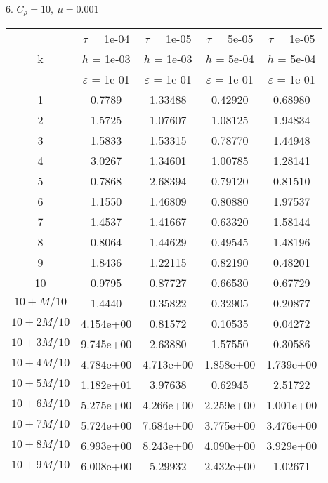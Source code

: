6. $C_{\rho} = 10, \ \mu = 0.001$
\begin{center}
	\begin{tabular}{ |c|c|c|c|c| } 
		\hline
		& $\tau$ = 1e-04 & $\tau$ = 1e-05 & $\tau$ = 5e-05 & $\tau$ = 1e-05 \\ 
		k & $h$ = 1e-03 & $h$ = 1e-03 & $h$ = 5e-04 & $h$ = 5e-04 \\ 
		& $\varepsilon$ = 1e-01 & $\varepsilon$ = 1e-01 & $\varepsilon$ = 1e-01 & $\varepsilon$ = 1e-01 \\ 
		\hline
		1 & 0.7789 & 1.33488 & 0.42920 & 0.68980 \\
		\hline
		2 & 1.5725 & 1.07607 & 1.08125 & 1.94834 \\
		\hline
		3 & 1.5833 & 1.53315 & 0.78770 & 1.44948 \\
		\hline
		4 & 3.0267 & 1.34601 & 1.00785 & 1.28141 \\
		\hline
		5 & 0.7868 & 2.68394 & 0.79120 & 0.81510 \\
		\hline
		6 & 1.1550 & 1.46809 & 0.80880 & 1.97537 \\
		\hline
		7 & 1.4537 & 1.41667 & 0.63320 & 1.58144 \\
		\hline
		8 & 0.8064 & 1.44629 & 0.49545 & 1.48196 \\
		\hline
		9 & 1.8436 & 1.22115 & 0.82190 & 0.48201 \\
		\hline
		10 & 0.9795 & 0.87727 & 0.66530 & 0.67729 \\
		\hline
		$10 + M/10$ & 1.4440 & 0.35822 & 0.32905 & 0.20877 \\
		\hline
		$10 + 2M/10$ & 4.154e+00 & 0.81572 & 0.10535 & 0.04272 \\
		\hline
		$10 + 3M/10$ & 9.745e+00 & 2.63880 & 1.57550 & 0.30586 \\
		\hline
		$10 + 4M/10$ & 4.784e+00 & 4.713e+00 & 1.858e+00 & 1.739e+00 \\
		\hline
		$10 + 5M/10$ & 1.182e+01 & 3.97638 & 0.62945 & 2.51722 \\
		\hline
		$10 + 6M/10$ & 5.275e+00 & 4.266e+00 & 2.259e+00 & 1.001e+00 \\
		\hline
		$10 + 7M/10$ & 5.724e+00 & 7.684e+00 & 3.775e+00 & 3.476e+00 \\
		\hline
		$10 + 8M/10$ & 6.993e+00 & 8.243e+00 & 4.090e+00 & 3.929e+00 \\
		\hline
		$10 + 9M/10$ & 6.008e+00 & 5.29932 & 2.432e+00 & 1.02671 \\
		\hline
	\end{tabular}
\end{center}

